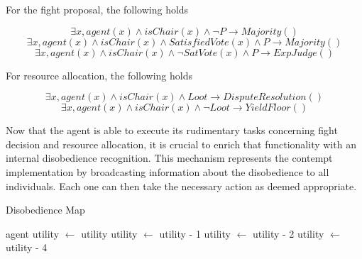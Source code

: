 For the fight proposal, the following holds

\begin{equation}
    \exists x, agent(x) \land isChair(x) \land \neg P \rightarrow Majority()
\end{equation}
\begin{equation}
    \exists x, agent(x) \land isChair(x) \land SatisfiedVote(x) \land P \rightarrow Majority()
\end{equation}
\begin{equation}
    \exists x, agent(x) \land isChair(x) \land \neg SatVote(x) \land P \rightarrow ExpJudge()
\end{equation}

For resource allocation, the following holds

\begin{equation}
    \exists x, agent(x) \land isChair(x) \land Loot \rightarrow DisputeResolution()
\end{equation}
\begin{equation}
    \exists x, agent(x) \land isChair(x) \land \neg Loot \rightarrow YieldFloor()
\end{equation}

Now that the agent is able to execute its rudimentary tasks concerning fight decision and resource allocation, it is crucial to enrich that functionality with an internal disobedience recognition. This mechanism represents the contempt implementation by broadcasting information about the disobedience to all individuals. Each one can then take the necessary action as deemed appropriate. 



\begin{algorithm}
\caption{Disobedience Map}\label{alg:20}
\begin{algorithmic}
\scriptsize
{}
\State agent utility $\leftarrow$ utility
\EndIf
\Else
{}
\State utility $\leftarrow$ utility - 1
\EndIf
{}
\State utility $\leftarrow$ utility - 2
\EndIf
{}
\State utility $\leftarrow$ utility - 4
\EndIf
\EndIf
\EndWhile
\end{algorithmic}
\end{algorithm}

